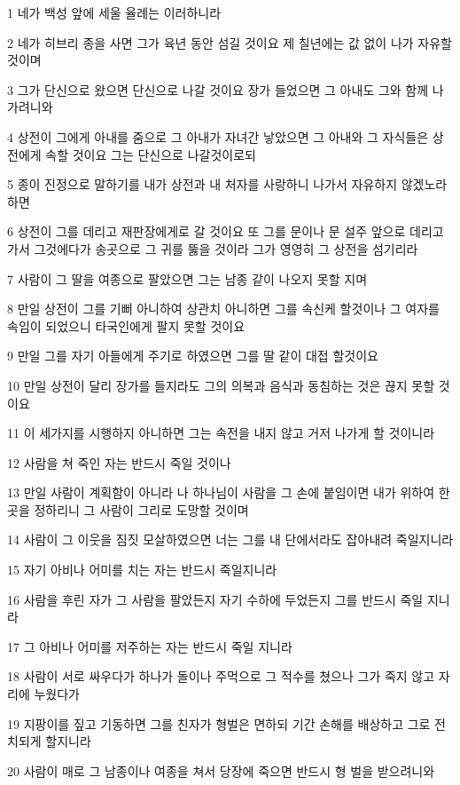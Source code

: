 \par 1 네가 백성 앞에 세울 율례는 이러하니라
\par 2 네가 히브리 종을 사면 그가 육년 동안 섬길 것이요 제 칠년에는 값 없이 나가 자유할 것이며
\par 3 그가 단신으로 왔으면 단신으로 나갈 것이요 장가 들었으면 그 아내도 그와 함께 나가려니와
\par 4 상전이 그에게 아내를 줌으로 그 아내가 자녀간 낳았으면 그 아내와 그 자식들은 상전에게 속할 것이요 그는 단신으로 나갈것이로되
\par 5 종이 진정으로 말하기를 내가 상전과 내 처자를 사랑하니 나가서 자유하지 않겠노라 하면
\par 6 상전이 그를 데리고 재판장에게로 갈 것이요 또 그를 문이나 문 설주 앞으로 데리고 가서 그것에다가 송곳으로 그 귀를 뚫을 것이라 그가 영영히 그 상전을 섬기리라
\par 7 사람이 그 딸을 여종으로 팔았으면 그는 남종 같이 나오지 못할 지며
\par 8 만일 상전이 그를 기뻐 아니하여 상관치 아니하면 그를 속신케 할것이나 그 여자를 속임이 되었으니 타국인에게 팔지 못할 것이요
\par 9 만일 그를 자기 아들에게 주기로 하였으면 그를 딸 같이 대접 할것이요
\par 10 만일 상전이 달리 장가를 들지라도 그의 의복과 음식과 동침하는 것은 끊지 못할 것이요
\par 11 이 세가지를 시행하지 아니하면 그는 속전을 내지 않고 거저 나가게 할 것이니라
\par 12 사람을 쳐 죽인 자는 반드시 죽일 것이나
\par 13 만일 사람이 계획함이 아니라 나 하나님이 사람을 그 손에 붙임이면 내가 위하여 한 곳을 정하리니 그 사람이 그리로 도망할 것이며
\par 14 사람이 그 이웃을 짐짓 모살하였으면 너는 그를 내 단에서라도 잡아내려 죽일지니라
\par 15 자기 아비나 어미를 치는 자는 반드시 죽일지니라
\par 16 사람을 후린 자가 그 사람을 팔았든지 자기 수하에 두었든지 그를 반드시 죽일 지니라
\par 17 그 아비나 어미를 저주하는 자는 반드시 죽일 지니라
\par 18 사람이 서로 싸우다가 하나가 돌이나 주먹으로 그 적수를 쳤으나 그가 죽지 않고 자리에 누웠다가
\par 19 지팡이를 짚고 기동하면 그를 친자가 형벌은 면하되 기간 손해를 배상하고 그로 전치되게 할지니라
\par 20 사람이 매로 그 남종이나 여종을 쳐서 당장에 죽으면 반드시 형 벌을 받으려니와
